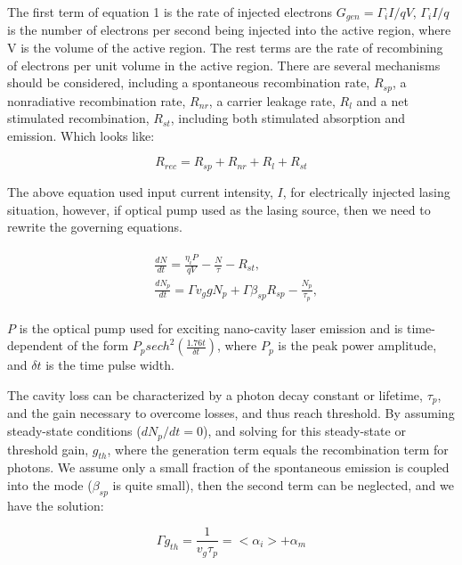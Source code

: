 The first term of equation 1 is the rate of injected electrons $G_{gen} =
{\Gamma_{i}I}/{qV}$, ${\Gamma_{i}I}/{q}$ is the number of electrons per
second being injected into the active region, where V is the volume of the
active region. The rest terms are the rate of recombining of electrons per unit
volume in the active region. There are several mechanisms should be considered,
including a spontaneous recombination rate, $R_{sp}$, a nonradiative
recombination rate, $R_{nr}$, a carrier leakage rate, $R_l$ and a net
stimulated recombination, $R_{st}$, including both stimulated absorption and
emission. Which looks like:

\begin{equation}
  R_{rec} = R_{sp} + R_{nr} + R_{l} + R_{st}
\end{equation}

The above equation used input current intensity, $I$, for electrically injected
lasing situation, however, if optical pump used as the lasing source, then we
need to rewrite the governing equations.

\begin{eqnarray}
\begin{aligned}
  & \frac{dN}{dt} = \frac{\eta_{i}P}{qV} - \frac{N}{\tau} - R_{st},
  \\
  & \frac{dN_p}{dt} = {\Gamma}v_g{g}N_p + \Gamma\beta_{sp}R_{sp} - \frac{N_p}{\tau_p},
\end{aligned}
\label{eq:eight}
\end{eqnarray}

$P$ is the optical pump used for exciting nano-cavity laser emission and is
time-dependent of the form $P_{p}sech^2(\frac{1.76t}{\delta{t}})$, where $P_p$ is the peak power amplitude, and $\delta{t}$ is the time pulse width.


The cavity loss can be characterized by a photon decay constant or lifetime,
$\tau_p$, and the gain necessary to overcome losses, and thus reach threshold.
By assuming steady-state conditions (\ie $dN_p/dt = 0$), and solving for this
steady-state or threshold gain, $g_{th}$, where the generation term equals the
recombination term for photons. We assume only a small fraction of the
spontaneous emission is coupled into the mode (\ie $\beta_{sp}$ is quite
small), then the second term can be neglected, and we have the solution:

\begin{equation}
  \Gamma{g_{th}} = \frac{1}{v_g\tau_p} = <\alpha_i> + \alpha_m
\end{equation}

